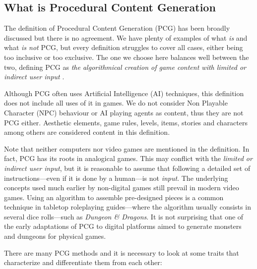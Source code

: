 
\subsection{What is Procedural Content Generation}
The definition of Procedural Content Generation (PCG) has been broadly discussed but there is no agreement. We have plenty of examples of what \textit{is} and what \textit{is not} PCG, but every definition struggles to cover all cases, either being too inclusive or too exclusive. The one we choose here balances well between the two, defining PCG as \textit{the algorithmical creation of game content with limited or indirect user input} \cite{togelius2011procedural}.


Although PCG often uses Artificial Intelligence (AI) techniques, this definition does not include all uses of it in games. We do not consider Non Playable Character (NPC) behaviour or AI playing agents as content, thus they are not PCG either. Aesthetic elements, game rules, levels, items, stories and characters among others are considered content in this definition.


Note that neither computers nor video games are mentioned in the definition. In fact, PCG has its roots in analogical games. This may conflict with the \textit{limited or indirect user input}, but it is reasonable to assume that following a detailed set of instructions---even if it is done by a human---is not \textit{input}. The underlying concepts used much earlier by non-digital games still prevail in modern video games. Using an algorithm to assemble pre-designed pieces is a common technique in tabletop roleplaying guides---where the algorithm usually consists in several dice rolls---such as \textit{Dungeon \& Dragons}. It is not surprising that one of the early adaptations of PCG to digital platforms aimed to generate monsters and dungeons for physical games.\cite{smith2015analog}


There are many PCG methods and it is necessary to look at some traits that characterize and differentiate them from each other: \cite{togelius2016introduction}

